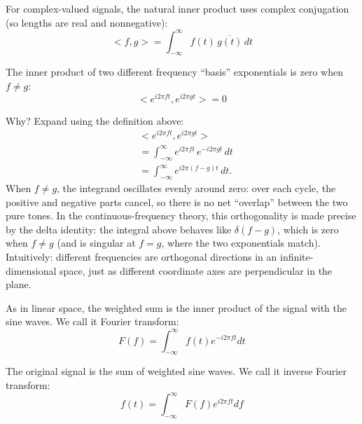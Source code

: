 For complex-valued signals, the natural inner product uses complex conjugation
(so lengths are real and nonnegative):
\[
<f, g> = \int_{-\infty}^{\infty} f(t)\,\overline{g(t)}\, dt
\]

The inner product of two different frequency ``basis'' exponentials is zero
when \(f\neq g\):
\[
<e^{i2\pi f t}, e^{i2\pi g t}> = 0
\]

Why? Expand using the definition above:
\[
\begin{aligned}
& <e^{i2\pi f t}, e^{i2\pi g t}> \\
&= \int_{-\infty}^{\infty} e^{i2\pi f t}\, e^{-i2\pi g t}\, dt \\
&= \int_{-\infty}^{\infty} e^{i2\pi (f-g) t}\, dt.
\end{aligned}
\]
When \(f\neq g\), the integrand oscillates evenly around zero: over each cycle,
the positive and negative parts cancel, so there is no net ``overlap'' between
the two pure tones. In the continuous-frequency theory, this orthogonality is
made precise by the delta identity: the integral above behaves like
\(\delta(f-g)\), which is zero when \(f\neq g\) (and is singular at \(f=g\),
where the two exponentials match). Intuitively: different frequencies are
orthogonal directions in an infinite-dimensional space, just as different
coordinate axes are perpendicular in the plane.

As in linear space, the weighted sum is the inner product of the signal with the sine waves.
We call it Fourier transform:
\[
F(f) = \int_{-\infty}^{\infty} f(t) e^{-i2\pi f t} dt
\]

The original signal is the sum of weighted sine waves. We call it inverse Fourier transform:
\[
f(t) = \int_{-\infty}^{\infty} F(f) e^{i2\pi f t} df
\]
